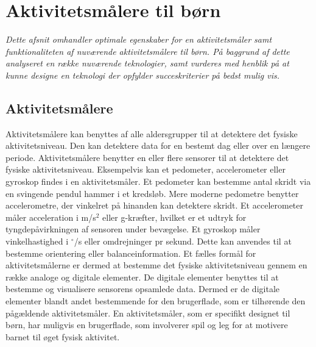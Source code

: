 \section{Aktivitetsmålere til børn} \label{tracker_intro}
\textit{Dette afsnit omhandler optimale egenskaber for en aktivitetsmåler samt funktionaliteten af nuværende aktivitetsmålere til børn. På baggrund af dette analyseret en række nuværende teknologier, samt vurderes med henblik på at kunne designe en teknologi der opfylder succeskriterier på bedst mulig vis.}

\subsection{Aktivitetsmålere}
Aktivitetsmålere kan benyttes af alle aldersgrupper til at detektere det fysiske aktivitetsniveau. Den kan detektere data for en bestemt dag eller over en længere periode. Aktivitetsmålere benytter en eller flere sensorer til at detektere det fysiske aktivitetsniveau. Eksempelvis kan et pedometer, accelerometer eller gyroskop findes i en aktivitetsmåler. Et pedometer kan bestemme antal skridt via en svingende pendul hammer i et kredsløb. Mere moderne pedometre benytter accelerometre, der vinkelret på hinanden kan detektere skridt. Et accelerometer måler acceleration i m/s$^2$ eller g-kræfter, hvilket er et udtryk for tyngdepåvirkningen af sensoren under bevægelse. Et gyroskop måler vinkelhastighed i $^\circ$/s eller omdrejninger pr sekund. Dette kan anvendes til at bestemme orientering eller balanceinformation. \citep{Sparkfun,Woodford2016,Sparkfun_gyro} \newline
Et fælles formål for aktivitetsmålerne er dermed at bestemme det fysiske aktivitetsniveau gennem en række analoge og digitale elementer. De digitale elementer benyttes til at bestemme og visualisere sensorens opsamlede data. Dermed er de digitale elementer blandt andet bestemmende for den brugerflade, som er tilhørende den pågældende aktivitetsmåler. En aktivitetsmåler, som er specifikt designet til børn, har muligvis en brugerflade, som involverer spil og leg for at motivere barnet til øget fysisk aktivitet. 

